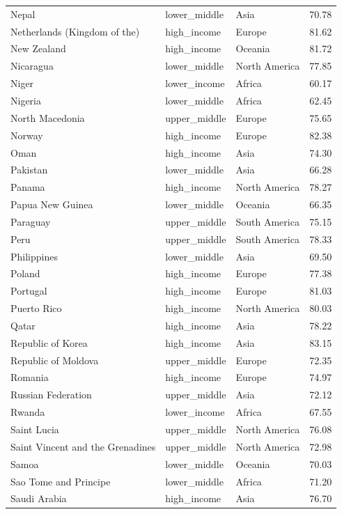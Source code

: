 \documentclass[
  letterpaper,
  DIV=11,
  numbers=noendperiod]{scrartcl}
\begin{document}
\begin{longtable}[t]{llll}
Nepal & lower\_middle & Asia & 70.78\\
\addlinespace
Netherlands (Kingdom of the) & high\_income & Europe & 81.62\\
New Zealand & high\_income & Oceania & 81.72\\
Nicaragua & lower\_middle & North America & 77.85\\
Niger & lower\_income & Africa & 60.17\\
Nigeria & lower\_middle & Africa & 62.45\\
\addlinespace
North Macedonia & upper\_middle & Europe & 75.65\\
Norway & high\_income & Europe & 82.38\\
Oman & high\_income & Asia & 74.30\\
Pakistan & lower\_middle & Asia & 66.28\\
Panama & high\_income & North America & 78.27\\
\addlinespace
Papua New Guinea & lower\_middle & Oceania & 66.35\\
Paraguay & upper\_middle & South America & 75.15\\
Peru & upper\_middle & South America & 78.33\\
Philippines & lower\_middle & Asia & 69.50\\
Poland & high\_income & Europe & 77.38\\
\addlinespace
Portugal & high\_income & Europe & 81.03\\
Puerto Rico & high\_income & North America & 80.03\\
Qatar & high\_income & Asia & 78.22\\
Republic of Korea & high\_income & Asia & 83.15\\
Republic of Moldova & upper\_middle & Europe & 72.35\\
\addlinespace
Romania & high\_income & Europe & 74.97\\
Russian Federation & upper\_middle & Asia & 72.12\\
Rwanda & lower\_income & Africa & 67.55\\
Saint Lucia & upper\_middle & North America & 76.08\\
Saint Vincent and the Grenadines & upper\_middle & North America & 72.98\\
\addlinespace
Samoa & lower\_middle & Oceania & 70.03\\
Sao Tome and Principe & lower\_middle & Africa & 71.20\\
Saudi Arabia & high\_income & Asia & 76.70\\

\end{longtable}
\end{document}
